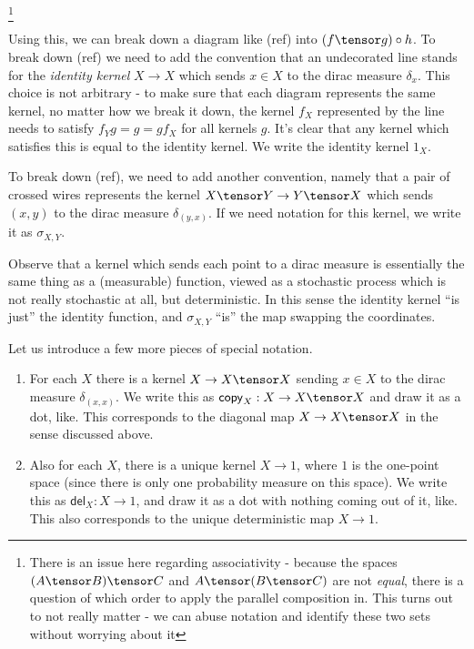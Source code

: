 \documentclass{article}
\begin{document}
\footnote{There is an issue here regarding associativity - because the spaces $(A \tensor B) \tensor C$ and $A \tensor (B \tensor C)$ are not \emph{equal}, there is a question of which order to apply the parallel composition in. This turns out to not really matter - we can abuse notation and identify these two sets without worrying about it}

Using this, we can break down a diagram like (ref) into $(f \tensor g) \circ h$.
To break down (ref) we need to add the convention that an undecorated line stands for the \emph{identity kernel} $X \to X$ which sends $x\in X$ to the dirac measure $\delta_x$.
This choice is not arbitrary - to make sure that each diagram represents the same kernel, no matter how we break it down, the kernel $f_X$ represented by the line needs to satisfy $f_Yg = g = gf_X$ for all kernels $g$.
It's clear that any kernel which satisfies this is equal to the identity kernel.
We write the identity kernel $1_X$.

To break down (ref), we need to add another convention, namely that a pair of crossed wires represents the kernel $X \tensor Y \to Y \tensor X$
which sends $(x,y)$ to the dirac measure $\delta_{(y,x)}$.
If we need notation for this kernel, we write it as $\sigma_{X,Y}$.

Observe that a kernel which sends each point to a dirac measure is essentially the same thing as a (measurable) function, viewed as a stochastic process which is not really stochastic at all, but deterministic. In this sense the identity kernel ``is just'' the identity function, and $\sigma_{X,Y}$ ``is'' the map swapping the coordinates.

Let us introduce a few more pieces of special notation.

\begin{enumerate}
    \item For each $X$ there is a kernel $X \to X \tensor X$ sending $x \in X$ to the dirac measure $\delta_{(x,x)}$.
    We write this as $\mathsf{copy}_X: X \to X \tensor X$ and draw it as a dot, like. This corresponds to the diagonal map $X \to X \tensor X$ in the sense discussed above.
    \item Also for each $X$, there is a unique kernel $X \to 1$, where $1$ is the one-point space (since there is only one probability measure on this space).
    We write this as $\mathsf{del}_X: X \to 1$, and draw it as a dot with nothing coming out of it, like. This also corresponds to the unique deterministic map $X \to 1$.
\end{enumerate}
\end{document}
